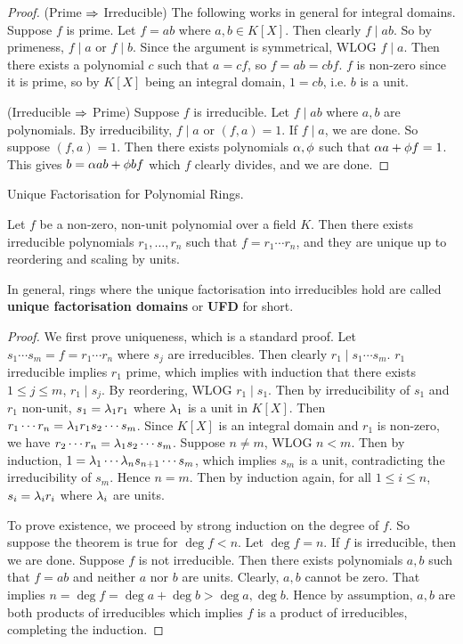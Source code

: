 \documentclass[../../book.tex]{subfiles}
\begin{document}
\begin{proof}
    (Prime $\Rightarrow$ Irreducible)
    The following works in general for integral domains. 
    Suppose $f$ is prime. Let $f = ab$ where $a, b \in K[X]$. 
    Then clearly $f \mid ab$. 
    So by primeness, $f \mid a$ or $f \mid b$. 
    Since the argument is symmetrical, WLOG $f \mid a$. 
    Then there exists a polynomial $c$ such that $a = cf$,
    so $f = ab = cbf$. 
    $f$ is non-zero since it is prime, so by $K[X]$ being an integral domain,
    $1 = cb$, i.e. $b$ is a unit. 
    
    (Irreducible $\Rightarrow$ Prime)
    Suppose $f$ is irreducible. Let $f \mid ab$ where $a, b$ are polynomials. 
    By irreducibility, $f \mid a$ or $(f, a) = 1$.
    If $f \mid a$, we are done. 
    So suppose $(f, a) = 1$. 
    Then there exists polynomials $\alpha, \phi$ such that $\alpha a + \phi f = 1$.
    This gives $b = \alpha a b + \phi b f$ which $f$ clearly divides, and we are done.
\end{proof}
\begin{thm} Unique Factorisation for Polynomial Rings.
    
    Let $f$ be a non-zero, non-unit polynomial over a field $K$.
    Then there exists irreducible polynomials $r_1, \dots, r_n$ such that
    $f = r_1\cdots r_n$, and they are unique up to reordering and scaling by units.
    
    In general, rings where the unique factorisation into irreducibles hold
    are called \textbf{unique factorisation domains} or \textbf{UFD} for short.
\end{thm}
\begin{proof}
    We first prove uniqueness, which is a standard proof.
    Let $s_1 \cdots s_m = f = r_1 \cdots r_n$ where $s_j$ are irreducibles.
    Then clearly $r_1 \mid s_1 \cdots s_m$. 
    $r_1$ irreducible implies $r_1$ prime, which implies with induction that
    there exists $1 \leq j \leq m$, $r_1 \mid s_j$. 
    By reordering, WLOG $r_1 \mid s_1$. 
    Then by irreducibility of $s_1$ and $r_1$ non-unit, 
    $s_1 = \lambda_1 r_1$ where $\lambda_1$ is a unit in $K[X]$. 
    Then $r_1 \cdots r_n = \lambda_1 r_1 s_2 \cdots s_m$. 
    Since $K[X]$ is an integral domain and $r_1$ is non-zero, 
    we have $r_2 \cdots r_n = \lambda_1 s_2 \cdots s_m$. 
    Suppose $n \neq m$, WLOG $n < m$. 
    Then by induction, $1 = \lambda_1 \cdots \lambda_n s_{n+1} \cdots s_m$,
    which implies $s_m$ is a unit, contradicting the irreducibility of $s_m$.
    Hence $n = m$. Then by induction again, for all $1\leq i \leq n$,
    $s_i = \lambda_i r_i$ where $\lambda_i$ are units. 
    
    To prove existence, we proceed by strong induction on the degree of $f$. 
    So suppose the theorem is true for $\deg f < n$. 
    Let $\deg f = n$. 
    If $f$ is irreducible, then we are done. 
    Suppose $f$ is not irreducible. 
    Then there exists polynomials $a, b$ such that $f = ab$ and 
    neither $a$ nor $b$ are units. 
    Clearly, $a, b$ cannot be zero. 
    That implies $n = \deg f = \deg a + \deg b > \deg a, \deg b$. 
    Hence by assumption, $a, b$ are both products of irreducibles
    which implies $f$ is a product of irreducibles, completing the induction. 
\end{proof}
\end{document}

